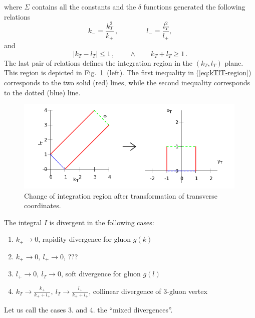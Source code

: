 \documentclass[a4paper,11pt]{report}
\numberwithin{equation}{section}
\begin{document}
%
where $\Sigma$ contains all the constants and the $\delta$ functions generated
the following relations
%
\begin{equation}
  k_- = \frac{k_T^2}{k_+}\,, \qquad \qquad
  l_- = \frac{l_T^2}{l_+},
\end{equation}
%
and
\begin{equation}
  | k_T - l_T | \leq 1\,,
  \qquad \land \qquad
   k_T + l_T  \geq 1\,.
  \label{eq:kTlT-region}
\end{equation}
%
The last pair of relations defines the integration region in the $(k_T, l_T)$
plane.  This region is depicted in Fig.~\ref{fig:trans-regions}~(left).  The
first inequality in (\ref{eq:kTlT-region}) corresponds to the two solid (red)
lines, while the second inequality corresponds to the dotted (blue) line.

\begin{figure}[t]
  \begin{center}
    \includegraphics[width=0.99\textwidth]{plots/transverse-phase-space.png}
  \end{center}
  \caption{
  Change of integration region after transformation of transverse coordinates.
  }
  \label{fig:trans-regions}
\end{figure}

The integral $I$ is divergent in the following cases:
%
\begin{enumerate}
  \item
    $k_+ \to 0$, 
    rapidity divergence for gluon $g(k)$
  \item 
    $k_+ \to 0,\ l_+ \to 0$, ???
  \item
    $l_+ \to 0,\ l_T \to 0$, 
    soft divergence for gluon $g(l)$
  \item
    $k_T \to \displaystyle \frac{k_+ }{k_+ + l_+},
    \ l_T \to \frac{l_+ }{k_+ + l_+}$,
    collinear divergence of 3-gluon vertex
\end{enumerate}
%
Let us call the cases 3. and 4. the ``mixed divergences''.
\end{document}
